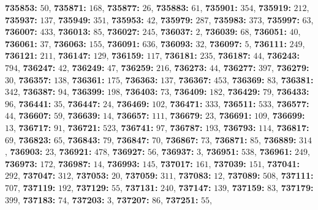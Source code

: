 \textsf{\bfseries 735853:} $50$, \textsf{\bfseries 735871:} $168$, \textsf{\bfseries 735877:} $26$, \textsf{\bfseries 735883:} $61$, \textsf{\bfseries 735901:} $354$, \textsf{\bfseries 735919:} $212$, \textsf{\bfseries 735937:} $137$, \textsf{\bfseries 735949:} $351$, \textsf{\bfseries 735953:} $42$, \textsf{\bfseries 735979:} $287$, \textsf{\bfseries 735983:} $373$, \textsf{\bfseries 735997:} $63$, \textsf{\bfseries 736007:} $433$, \textsf{\bfseries 736013:} $85$, \textsf{\bfseries 736027:} $245$, \textsf{\bfseries 736037:} $2$, \textsf{\bfseries 736039:} $68$, \textsf{\bfseries 736051:} $40$, \textsf{\bfseries 736061:} $37$, \textsf{\bfseries 736063:} $155$, \textsf{\bfseries 736091:} $636$, \textsf{\bfseries 736093:} $32$, \textsf{\bfseries 736097:} $5$, \textsf{\bfseries 736111:} $249$, \textsf{\bfseries 736121:} $211$, \textsf{\bfseries 736147:} $129$, \textsf{\bfseries 736159:} $117$, \textsf{\bfseries 736181:} $235$, \textsf{\bfseries 736187:} $44$, \textsf{\bfseries 736243:} $794$, \textsf{\bfseries 736247:} $42$, \textsf{\bfseries 736249:} $47$, \textsf{\bfseries 736259:} $216$, \textsf{\bfseries 736273:} $44$, \textsf{\bfseries 736277:} $397$, \textsf{\bfseries 736279:} $30$, \textsf{\bfseries 736357:} $138$, \textsf{\bfseries 736361:} $175$, \textsf{\bfseries 736363:} $137$, \textsf{\bfseries 736367:} $453$, \textsf{\bfseries 736369:} $83$, \textsf{\bfseries 736381:} $342$, \textsf{\bfseries 736387:} $94$, \textsf{\bfseries 736399:} $198$, \textsf{\bfseries 736403:} $73$, \textsf{\bfseries 736409:} $182$, \textsf{\bfseries 736429:} $79$, \textsf{\bfseries 736433:} $96$, \textsf{\bfseries 736441:} $35$, \textsf{\bfseries 736447:} $24$, \textsf{\bfseries 736469:} $102$, \textsf{\bfseries 736471:} $333$, \textsf{\bfseries 736511:} $533$, \textsf{\bfseries 736577:} $44$, \textsf{\bfseries 736607:} $59$, \textsf{\bfseries 736639:} $14$, \textsf{\bfseries 736657:} $111$, \textsf{\bfseries 736679:} $23$, \textsf{\bfseries 736691:} $109$, \textsf{\bfseries 736699:} $13$, \textsf{\bfseries 736717:} $91$, \textsf{\bfseries 736721:} $523$, \textsf{\bfseries 736741:} $97$, \textsf{\bfseries 736787:} $193$, \textsf{\bfseries 736793:} $114$, \textsf{\bfseries 736817:} $69$, \textsf{\bfseries 736823:} $65$, \textsf{\bfseries 736843:} $79$, \textsf{\bfseries 736847:} $70$, \textsf{\bfseries 736867:} $73$, \textsf{\bfseries 736871:} $85$, \textsf{\bfseries 736889:} $314$, \textsf{\bfseries 736903:} $23$, \textsf{\bfseries 736921:} $478$, \textsf{\bfseries 736927:} $56$, \textsf{\bfseries 736937:} $3$, \textsf{\bfseries 736951:} $538$, \textsf{\bfseries 736961:} $249$, \textsf{\bfseries 736973:} $172$, \textsf{\bfseries 736987:} $14$, \textsf{\bfseries 736993:} $145$, \textsf{\bfseries 737017:} $161$, \textsf{\bfseries 737039:} $151$, \textsf{\bfseries 737041:} $292$, \textsf{\bfseries 737047:} $312$, \textsf{\bfseries 737053:} $20$, \textsf{\bfseries 737059:} $311$, \textsf{\bfseries 737083:} $12$, \textsf{\bfseries 737089:} $508$, \textsf{\bfseries 737111:} $707$, \textsf{\bfseries 737119:} $192$, \textsf{\bfseries 737129:} $55$, \textsf{\bfseries 737131:} $240$, \textsf{\bfseries 737147:} $139$, \textsf{\bfseries 737159:} $83$, \textsf{\bfseries 737179:} $399$, \textsf{\bfseries 737183:} $74$, \textsf{\bfseries 737203:} $3$, \textsf{\bfseries 737207:} $86$, \textsf{\bfseries 737251:} $55$, 
